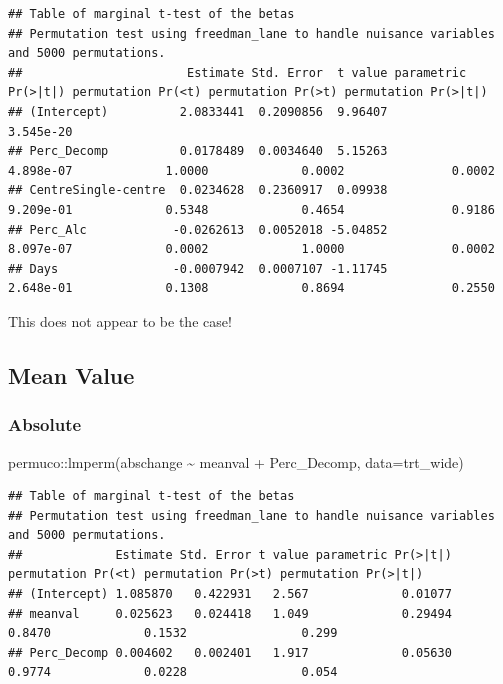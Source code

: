 \documentclass[
]{article}
\newenvironment{Shaded}{\begin{snugshade}}{\end{snugshade}}
\newcommand{\AttributeTok}[1]{\textcolor[rgb]{0.77,0.63,0.00}{#1}}
\newcommand{\FunctionTok}[1]{\textcolor[rgb]{0.00,0.00,0.00}{#1}}
\newcommand{\NormalTok}[1]{#1}
\newcommand{\SpecialCharTok}[1]{\textcolor[rgb]{0.00,0.00,0.00}{#1}}
\begin{document}
\begin{verbatim}
## Table of marginal t-test of the betas
## Permutation test using freedman_lane to handle nuisance variables and 5000 permutations.
##                       Estimate Std. Error  t value parametric Pr(>|t|) permutation Pr(<t) permutation Pr(>t) permutation Pr(>|t|)
## (Intercept)          2.0833441  0.2090856  9.96407           3.545e-20                                                           
## Perc_Decomp          0.0178489  0.0034640  5.15263           4.898e-07             1.0000             0.0002               0.0002
## CentreSingle-centre  0.0234628  0.2360917  0.09938           9.209e-01             0.5348             0.4654               0.9186
## Perc_Alc            -0.0262613  0.0052018 -5.04852           8.097e-07             0.0002             1.0000               0.0002
## Days                -0.0007942  0.0007107 -1.11745           2.648e-01             0.1308             0.8694               0.2550
\end{verbatim}

This does not appear to be the case!

\hypertarget{mean-value}{%
\subsection{Mean Value}\label{mean-value}}

\hypertarget{absolute-2}{%
\subsubsection{Absolute}\label{absolute-2}}

\begin{Shaded}
\begin{Highlighting}[]
\NormalTok{permuco}\SpecialCharTok{::}\FunctionTok{lmperm}\NormalTok{(abschange }\SpecialCharTok{\textasciitilde{}}\NormalTok{ meanval }\SpecialCharTok{+}\NormalTok{ Perc\_Decomp, }\AttributeTok{data=}\NormalTok{trt\_wide)}
\end{Highlighting}
\end{Shaded}

\begin{verbatim}
## Table of marginal t-test of the betas
## Permutation test using freedman_lane to handle nuisance variables and 5000 permutations.
##             Estimate Std. Error t value parametric Pr(>|t|) permutation Pr(<t) permutation Pr(>t) permutation Pr(>|t|)
## (Intercept) 1.085870   0.422931   2.567             0.01077                                                           
## meanval     0.025623   0.024418   1.049             0.29494             0.8470             0.1532                0.299
## Perc_Decomp 0.004602   0.002401   1.917             0.05630             0.9774             0.0228                0.054
\end{verbatim}
\end{document}

